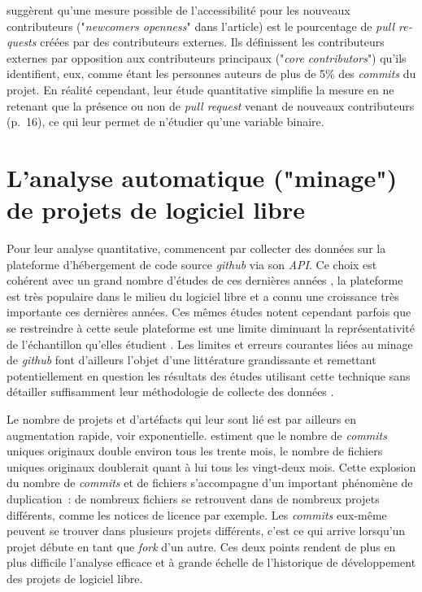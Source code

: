 \documentclass[dvipsnames]{llncs}
\newcommand{\en}[1]{\foreignlanguage{english}{\emph{#1}}}
\begin{document}
    \textcite{signals-2019} suggèrent qu'une mesure possible de l'accessibilité pour les nouveaux
    contributeurs ("\en{newcomers openness}" dans l'article) est le pourcentage de \en{pull requests} créées
    par des contributeurs externes. Ils définissent les contributeurs externes par opposition aux
    contributeurs principaux ("\en{core contributors}") qu'ils identifient, eux, comme étant les personnes
    auteurs de plus de 5\% des \en{commits} du projet. En réalité cependant, leur étude quantitative simplifie
    la mesure en ne retenant que la présence ou non de \en{pull request} venant de nouveaux contributeurs
    (p.~16), ce qui leur permet de n'étudier qu'une variable binaire.

    \section{L'analyse automatique ("minage") de projets de logiciel libre}

    Pour leur analyse quantitative, \textcite{signals-2019} commencent par collecter des données sur la
    plateforme d'hébergement de code source \en{github} via son \en{API}. Ce choix est cohérent avec un grand
    nombre d'études de ces dernières années \parencite{github-mapping-2017}, la plateforme est très populaire
    dans le milieu du logiciel libre et a connu une croissance très importante ces dernières années. Ces mêmes
    études notent cependant parfois que se restreindre à cette seule plateforme est une limite diminuant la
    représentativité de l'échantillon qu'elles étudient \parencite{swh-growth-2019}. Les limites et erreurs
    courantes liées au minage de \en{github} font d'ailleurs l'objet d'une littérature grandissante et
    remettant potentiellement en question les résultats des études utilisant cette technique sans détailler
    suffisamment leur méthodologie de collecte des données \parencite{mining-github-2014,penumbra-oss-2022}.

    Le nombre de projets et d'artéfacts qui leur sont lié est par ailleurs en augmentation rapide, voir
    exponentielle. \textcite{swh-growth-2019} estiment que le nombre de \en{commits} uniques originaux double
    environ tous les trente mois, le nombre de fichiers uniques originaux doublerait quant à lui tous les
    vingt-deux mois. Cette explosion du nombre de \en{commits} et de fichiers s'accompagne d'un important
    phénomène de duplication : de nombreux fichiers se retrouvent dans de nombreux projets différents, comme
    les notices de licence par exemple. Les \en{commits} eux-même peuvent se trouver dans plusieurs projets
    différents, c'est ce qui arrive lorsqu'un projet débute en tant que \en{fork} d'un autre. Ces deux points
    rendent de plus en plus difficile l'analyse efficace et à grande échelle de l'historique de développement
    des projets de logiciel libre.
\end{document}
